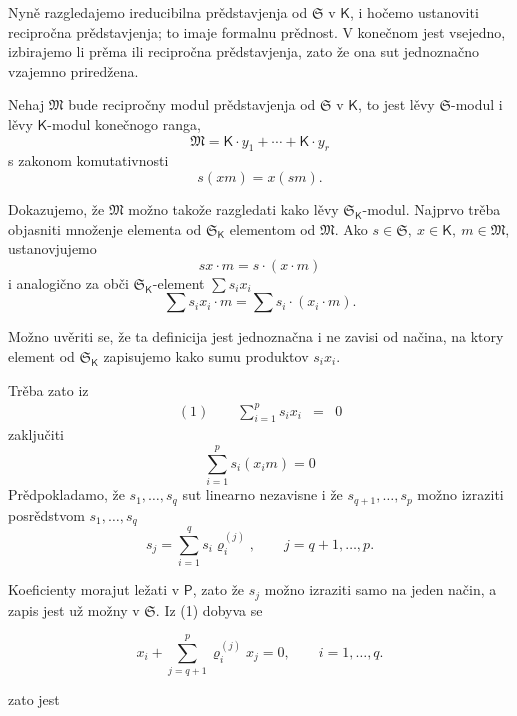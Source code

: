\documentclass[11pt]{article}
\begin{document}
Nyně razgledajemo ireducibilna prědstavjenja od \(\mathfrak S\) v \(\mathsf K\), i hočemo ustanoviti recipročna prědstavjenja; to imaje formalnu prědnost. V konečnom jest vsejedno, izbirajemo li prěma ili recipročna prědstavjenja, zato že ona sut jednoznačno vzajemno priredžena.

Nehaj \(\mathfrak M\) bude recipročny modul prědstavjenja od \(\mathfrak S\) v \(\mathsf K\), to jest lěvy \(\mathfrak S\)-modul i lěvy \(\mathsf K\)-modul konečnogo ranga,
\[
\mathfrak M=\mathsf K\cdot y_1+\cdots+\mathsf K\cdot y_r
\]
s zakonom komutativnosti
\[
s(xm)=x(sm).
\]

Dokazujemo, že \(\mathfrak M\) možno takože razgledati kako lěvy \(\mathfrak S_{\mathsf K}\)-modul. Najprvo trěba objasniti množenje elementa od \(\mathfrak S_{\mathsf K}\) elementom od \(\mathfrak M\). Ako \(s\in\mathfrak S,\ x\in\mathsf K,\ m\in\mathfrak M\), ustanovjujemo
\[
sx\cdot m=s\cdot(x\cdot m)
\]
i analogično za obči \(\mathfrak S_{\mathsf K}\)-element \(\sum s_ix_i\)
\[
\sum s_ix_i\cdot m=\sum s_i\cdot(x_i\cdot m).
\]

Možno uvěriti se, že ta definicija jest jednoznačna i ne zavisi od načina, na ktory element od \(\mathfrak S_{\mathsf K}\) zapisujemo kako sumu produktov \(s_ix_i\).

Trěba zato iz
\[
\begin{array}{rcl}
(1)\qquad \displaystyle\sum_{i=1}^{p}s_ix_i&=&0
\end{array}
\]
zaključiti
\[
\sum_{i=1}^{p}s_i(x_i m)=0
\]
Prědpokladamo, že \(s_1,\ldots,s_q\) sut linearno nezavisne i že \(s_{q+1},\ldots,s_p\) možno izraziti posrědstvom \(s_1,\ldots,s_q\)
\[
s_j=\sum_{i=1}^{q}s_i\varrho_i^{(j)},\qquad j=q+1,\ldots,p.
\]

Koeficienty morajut ležati v \(\mathsf P\), zato že \(s_j\) možno izraziti samo na jeden način, a zapis jest už možny v \(\mathfrak S\). Iz (1) dobyva se

\[
x_i+\sum_{j=q+1}^{p}\varrho_i^{(j)}x_j=0,\qquad i=1,\ldots,q.
\]

zato jest
\end{document}
